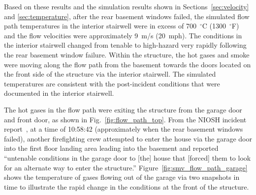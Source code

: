 \documentclass[12pt,oneside]{book}
\begin{document}
Based on these results and the simulation results shown in Sections~\ref{sec:velocity} and \ref{sec:temperature}, after the rear basement windows failed, the simulated flow path temperatures in the interior stairwell were in excess of 700~$^{\circ}$C (1300~$^{\circ}$F) and the flow velocities were approximately 9~m/s (20~mph). The conditions in the interior stairwell changed from tenable to high-hazard very rapidly following the rear basement window failure. Within the structure, the hot gases and smoke were moving along the flow path from the basement towards the doors located on the front side of the structure via the interior stairwell. The simulated temperatures are consistent with the post-incident conditions that were documented in the interior stairwell.

The hot gases in the flow path were exiting the structure from the garage door and front door, as shown in Fig.~\ref{fig:flow_path_top}. From the NIOSH incident report~\cite{NIOSH:Bowyer2}, at a time of 10:58:42 (approximately when the rear basement windows failed), another firefighting crew attempted to enter the house via the garage door into the first floor landing area leading into the basement and reported ``untenable conditions in the garage door to [the] house that [forced] them to look for an alternate way to enter the structure.'' Figure~\ref{fig:smv_flow_path_garage} shows the temperature of gases flowing out of the garage via two snapshots in time to illustrate the rapid change in the conditions at the front of the structure.
\end{document}
